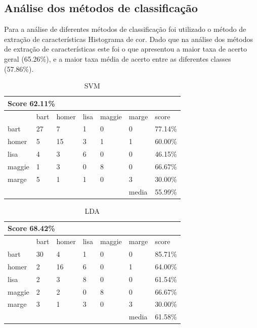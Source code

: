 \documentclass[paper=a4, fontsize=11pt]{scrartcl} %
\numberwithin{equation}{section} %
\numberwithin{figure}{section} %
\numberwithin{table}{section} %
\begin{document}
\subsection {Análise dos métodos de classificação}

Para a análise de diferentes métodos de classificação foi utilizado o método de extração de características Histograma de cor.
Dado que na análise dos métodos de extração de características este foi o que apresentou a maior taxa de acerto geral (65.26\%), e a maior taxa média de acerto entre as diferentes classes (57.86\%).

\begin{table}[!htb]
\centering
\caption{SVM}
\label{tbl:svm}
\begin{tabular}{|l|l|l|l|l|l|l|}
\hline
\multicolumn{7}{|l|}{\textbf{Score 62.11\%}}                   \\ \hline
         & bart   & homer   & lisa   & maggie   & marge  & score    \\ \hline
bart     & 27     & 7       & 1      & 0        & 0      & 77.14\%  \\ \hline
homer    & 5      & 15      & 3      & 1        & 1      & 60.00\%  \\ \hline
lisa     & 4      & 3       & 6      & 0        & 0      & 46.15\%  \\ \hline
maggie   & 1      & 3       & 0      & 8        & 0      & 66.67\%  \\ \hline
marge    & 5      & 1       & 1      & 0        & 3      & 30.00\%  \\ \hline
         &        &         &        &          & media  & 55.99\%  \\ \hline
\end{tabular}
\end{table}

\begin{table}[!htb]
\centering
\caption{LDA}
\label{tbl:lda}
\begin{tabular}{|l|l|l|l|l|l|l|}
\hline
\multicolumn{7}{|l|}{\textbf{Score 68.42\%}}                   \\ \hline
         & bart   & homer   & lisa   & maggie   & marge  & score    \\ \hline
bart     & 30     & 4       & 1      & 0        & 0      & 85.71\%  \\ \hline
homer    & 2      & 16      & 6      & 0        & 1      & 64.00\%  \\ \hline
lisa     & 2      & 3       & 8      & 0        & 0      & 61.54\%  \\ \hline
maggie   & 2      & 2       & 0      & 8        & 0      & 66.67\%  \\ \hline
marge    & 3      & 1       & 3      & 0        & 3      & 30.00\%  \\ \hline
         &        &         &        &          & media  & 61.58\%  \\ \hline
\end{tabular}
\end{table}
\end{document}
